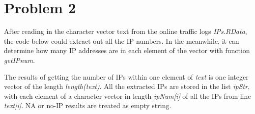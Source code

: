 \documentclass{article}
\begin{document}
\section*{Problem 2}

After reading in the character vector text from the online traffic logs \textit{IPs.RData}, the 
code below could extract out all the IP numbers. In the meanwhile, it can determine how many IP 
addresses are in each element of the vector with function \textit{getIPnum}.


The results of getting the number of IPs within one element of \textit{text} is one integer vector of 
the length \textit{length(text)}. All the extracted IPs are stored in the list \textit{ipStr}, 
with each element of a character vector in length \textit{ipNum[i]} of all the IPs from line \textit{text[i]}.
NA or no-IP results are treated as empty string.

\end{document}

